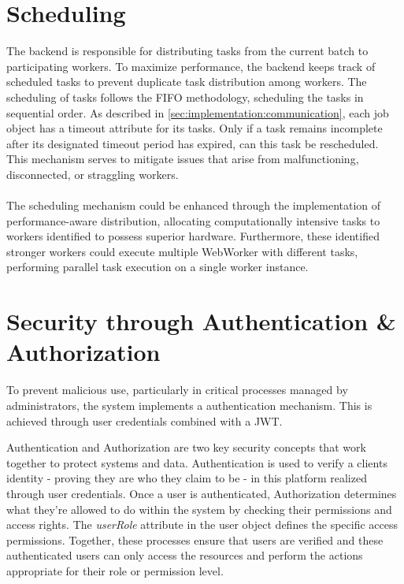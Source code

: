 \section{Scheduling}
\label{sec:implementation:scheduling}
The backend is responsible for distributing tasks from the current batch to participating workers. To maximize performance, the backend keeps track of scheduled tasks to prevent duplicate task distribution among workers. The scheduling of tasks follows the \ac{FIFO} methodology, scheduling the tasks in sequential order. As described in \autoref{sec:implementation:communication}, each job object has a timeout attribute for its tasks. Only if a task remains incomplete after its designated timeout period has expired, can this task be rescheduled. This mechanism serves to mitigate issues that arise from malfunctioning, disconnected, or straggling workers.
\\~\\
The scheduling mechanism could be enhanced through the implementation of performance-aware distribution, allocating computationally intensive tasks to workers identified to possess superior hardware. Furthermore, these identified stronger workers could execute multiple WebWorker with different tasks, performing parallel task execution on a single worker instance.

\section{Security through Authentication \& Authorization}
\label{sec:implementation:authentication}
To prevent malicious use, particularly in critical processes managed by administrators, the system implements a authentication mechanism. This is achieved through user credentials combined with a \ac{JWT}.

Authentication and Authorization are two key security concepts that work together to protect systems and data. Authentication is used to verify a clients identity - proving they are who they claim to be - in this platform realized through user credentials. Once a user is authenticated, Authorization determines what they're allowed to do within the system by checking their permissions and access rights. The \emph{userRole} attribute in the user object defines the specific access permissions. Together, these processes ensure that users are verified and these authenticated users can only access the resources and perform the actions appropriate for their role or permission level.

